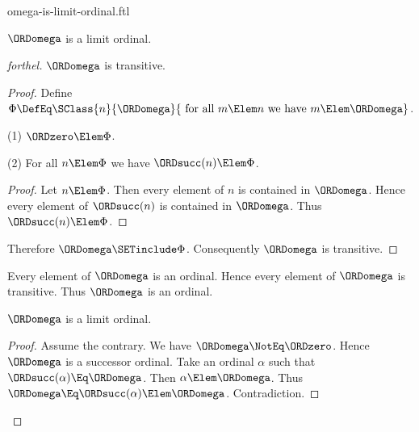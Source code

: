 \documentclass{stex}
\begin{document}
\begin{smodule}{omega-is-limit-ordinal.ftl}

\begin{proposition}[forthel]
  $\ORDomega$ is a limit ordinal.
\end{proposition}
\begin{proof}[forthel]
  $\ORDomega$ is transitive.
  \begin{proof}
    Define $\Phi \DefEq \SClass{n}{\ORDomega}{\text{ for all }m \Elem n\text{ we have }m \Elem \ORDomega}$.

    (1) $\ORDzero \Elem \Phi$.

    (2) For all $n \Elem \Phi$ we have $\ORDsucc(n) \Elem \Phi$.
    \begin{proof}
      Let $n \Elem \Phi$.
      Then every element of $n$ is contained in $\ORDomega$.
      Hence every element of $\ORDsucc(n)$ is contained in $\ORDomega$.
      Thus $\ORDsucc(n) \Elem \Phi$.
    \end{proof}

    Therefore $\ORDomega \SETinclude \Phi$.
    Consequently $\ORDomega$ is transitive.
  \end{proof}

  Every element of $\ORDomega$ is an ordinal.
  Hence every element of $\ORDomega$ is transitive.
  Thus $\ORDomega$ is an ordinal.

  $\ORDomega$ is a limit ordinal.
  \begin{proof}
    Assume the contrary.
    We have $\ORDomega \NotEq \ORDzero$.
    Hence $\ORDomega$ is a successor ordinal.
    Take an ordinal $\alpha$ such that $\ORDsucc(\alpha) \Eq \ORDomega$.
    Then $\alpha \Elem \ORDomega$.
    Thus $\ORDomega \Eq \ORDsucc(\alpha) \Elem \ORDomega$.
    Contradiction.
  \end{proof}
\end{proof}
\end{smodule}
\end{document}
